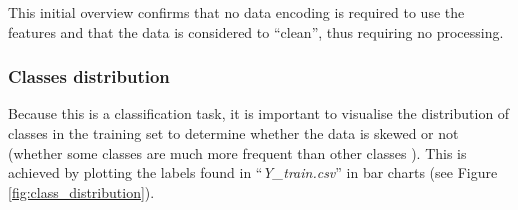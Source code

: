 \documentclass[letterpaper,12pt]{article}
\begin{document}
This initial overview confirms that no data encoding is required to use the features and that the data is considered to ``clean'', thus requiring no processing.

\subsubsection{Classes distribution}
\label{sec:classes-distribution}

Because this is a classification task, it is important to visualise the distribution of classes in the training  set to determine whether the data is skewed or not (whether some classes are much more frequent than other classes \cite{Geron2019}). This is achieved by plotting the labels found in ``\textit{Y\_train.csv}'' in bar charts (see Figure \ref{fig:class_distribution}).\\
\end{document}
